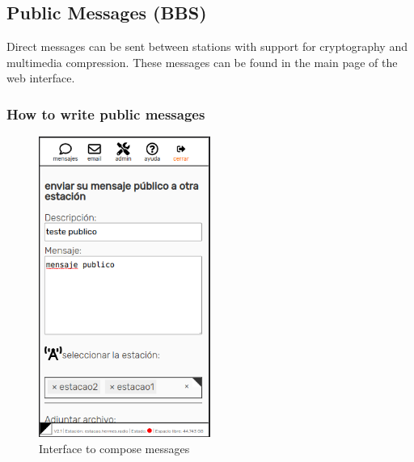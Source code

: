 \documentclass[11pt,a4paper]{article}
\begin{document}
\subsection{Public Messages  (BBS)}

Direct messages can be sent between stations with support for cryptography and  multimedia compression. These messages can be found in the main page of the web interface.

\subsubsection{How to write public messages}


\begin{figure}[H]
    \centering
    \includegraphics[width=0.5\textwidth]{screenshots/frontend/es/publicas.png}
    \caption{Interface to compose messages}
    \label{fig:compose}
\end{figure}
\end{document}
